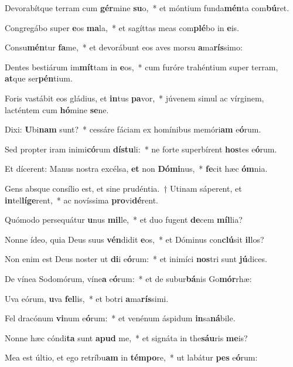 \item Devorabítque terram cum \textbf{gér}mine \textbf{su}o,~* et móntium funda\textbf{mén}ta com\textbf{bú}ret.
\item Congregábo super \textbf{e}os \textbf{ma}la,~* et sagíttas meas com\textbf{plé}bo in \textbf{e}is.
\item Consu\textbf{mén}tur \textbf{fa}me,~* et devorábunt eos aves morsu \textbf{a}ma\textbf{rís}simo:
\item Dentes bestiárum im\textbf{mít}tam in \textbf{e}os,~* cum furóre trahéntium super terram, \textbf{at}que ser\textbf{pén}tium.
\item Foris vastábit eos gládius, et \textbf{in}tus \textbf{pa}vor,~* júvenem simul ac vírginem, lacténtem cum \textbf{hó}mine \textbf{se}ne.
\item Dixi: \textbf{U}bi\textbf{nam} sunt?~* cessáre fáciam ex homínibus memóri\textbf{am} e\textbf{ó}rum.
\item Sed propter iram inimi\textbf{có}rum \textbf{dís}\textbf{tu}li:~* ne forte superbírent \textbf{hos}tes e\textbf{ó}rum.
\item Et dícerent: Manus nostra excélsa, \textbf{et} non \textbf{Dó}\textbf{mi}nus,~* \textbf{fe}cit hæc \textbf{óm}nia.
\item Gens absque consílio est, et sine prudéntia.~† Utinam sáperent, et \textbf{in}tel\textbf{lí}\textbf{ge}rent,~* ac novíssima \textbf{pro}vi\textbf{dé}rent.
\item Quómodo persequátur \textbf{u}nus \textbf{mil}le,~* et duo fugent \textbf{de}cem \textbf{míl}lia?
\item Nonne ídeo, quia Deus suus \textbf{vén}didit \textbf{e}os,~* et Dóminus con\textbf{clú}sit \textbf{il}los?
\item Non enim est Deus noster ut \textbf{di}i e\textbf{ó}rum:~* et inimíci \textbf{nos}tri sunt \textbf{jú}dices.
\item De vínea Sodomórum, víne\textbf{a} e\textbf{ó}rum:~* et de subur\textbf{bá}nis Go\textbf{mór}rhæ:
\item Uva eórum, \textbf{u}va \textbf{fel}lis,~* et botri \textbf{a}ma\textbf{rís}simi.
\item Fel dracónum \textbf{vi}num e\textbf{ó}rum:~* et venénum áspidum \textbf{in}sa\textbf{ná}bile.
\item Nonne hæc cóndi\textbf{ta} sunt \textbf{a}\textbf{pud} me,~* et signáta in the\textbf{sáu}ris \textbf{me}is?
\item Mea est últio, et ego retríbu\textbf{am} in \textbf{tém}\textbf{po}re,~* ut labátur \textbf{pes} e\textbf{ó}rum:
